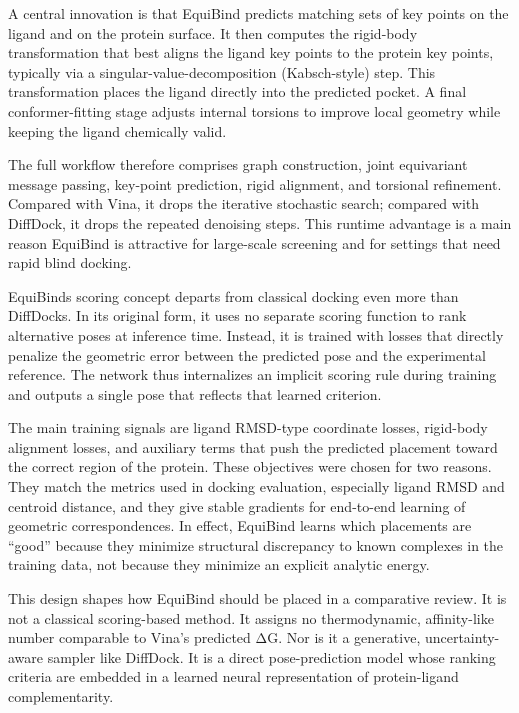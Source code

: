 A central innovation is that EquiBind predicts matching sets of key points on the ligand and on the protein surface. It then computes the rigid-body transformation that best aligns the ligand key points to the protein key points, typically via a singular-value-decomposition (Kabsch-style) step. This transformation places the ligand directly into the predicted pocket. A final conformer-fitting stage adjusts internal torsions to improve local geometry while keeping the ligand chemically valid.

The full workflow therefore comprises graph construction, joint equivariant message passing, key-point prediction, rigid alignment, and torsional refinement. Compared with Vina, it drops the iterative stochastic search; compared with DiffDock, it drops the repeated denoising steps. This runtime advantage is a main reason EquiBind is attractive for large-scale screening and for settings that need rapid blind docking.

EquiBind\textquotesingle s scoring concept departs from classical docking even more than DiffDock\textquotesingle s. In its original form, it uses no separate scoring function to rank alternative poses at inference time. Instead, it is trained with losses that directly penalize the geometric error between the predicted pose and the experimental reference. The network thus internalizes an implicit scoring rule during training and outputs a single pose that reflects that learned criterion.

The main training signals are ligand RMSD-type coordinate losses, rigid-body alignment losses, and auxiliary terms that push the predicted placement toward the correct region of the protein. These objectives were chosen for two reasons. They match the metrics used in docking evaluation, especially ligand RMSD and centroid distance, and they give stable gradients for end-to-end learning of geometric correspondences. In effect, EquiBind learns which placements are ``good'' because they minimize structural discrepancy to known complexes in the training data, not because they minimize an explicit analytic energy.

This design shapes how EquiBind should be placed in a comparative review. It is not a classical scoring-based method. It assigns no thermodynamic, affinity-like number comparable to Vina's predicted ΔG. Nor is it a generative, uncertainty-aware sampler like DiffDock. It is a direct pose-prediction model whose ranking criteria are embedded in a learned neural representation of protein-ligand complementarity.

